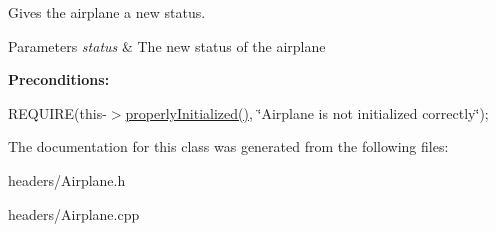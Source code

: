 Gives the airplane a new status. 


\begin{DoxyParams}{Parameters}
{\em status} & The new status of the airplane\\
\hline
\end{DoxyParams}
{\bfseries Preconditions\+:}
\begin{DoxyItemize}
\item R\+E\+Q\+U\+I\+RE(this-\/$>$\mbox{\hyperlink{class_airplane_a6f80df8f692cc8d67d292c1e9f26d59e}{properly\+Initialized()}}, \char`\"{}\+Airplane is not initialized correctly\char`\"{}); 
\end{DoxyItemize}

The documentation for this class was generated from the following files\+:\begin{DoxyCompactItemize}
\item 
headers/Airplane.\+h\item 
headers/Airplane.\+cpp\end{DoxyCompactItemize}
